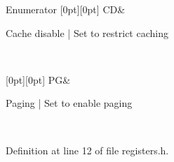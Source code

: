 \begin{DoxyEnumFields}{Enumerator}
[0pt][0pt]{}\mbox{\label{namespace_c_r0_a9b4684de9b26ecfcede75561aae698c6a4154f3b5cb906ec0bfab20c87e8a7d84}} 
CD&
\begin{DoxyPre}Cache disable       | Set to restrict caching                                               \end{DoxyPre}
 \\
\hline

[0pt][0pt]{}\mbox{\label{namespace_c_r0_a9b4684de9b26ecfcede75561aae698c6a674029f08e40b913896b27f5cb5e1ec8}} 
PG&
\begin{DoxyPre}Paging              | Set to enable paging                                                  \end{DoxyPre}
 \\
\hline

\end{DoxyEnumFields}


Definition at line 12 of file registers.\+h.


